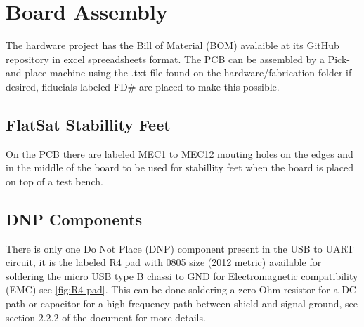 %
%
%
%
%

%
%
%
%
%
%

\chapter{Board Assembly}

The hardware project has the Bill of Material (BOM) avalaible at its GitHub repository in excel spreeadsheets format. The PCB can be assembled by a Pick-and-place machine using the .txt file found on the hardware/fabrication folder if desired, fiducials labeled FD\# are placed to make this possible.

\section{FlatSat Stabillity Feet}

On the PCB there are labeled MEC1 to MEC12 mouting holes on the edges and in the middle of the board to be used for stabillity feet when the board is placed on top of a test bench.

\section{DNP Components}

There is only one Do Not Place (DNP) component present in the USB to UART circuit, it is the labeled R4 pad with 0805 size (2012 metric) available for soldering the micro USB type B chassi to GND for Electromagnetic compatibility (EMC) see \autoref{fig:R4-pad}. This can be done soldering a zero-Ohm resistor for a DC path or capacitor for a high-frequency path between shield and signal ground, see section 2.2.2 of the document \cite{ftdi-usb-hardware-guidelines} for more details.

